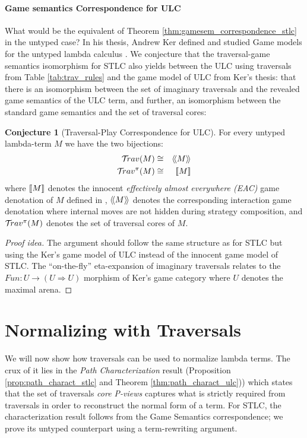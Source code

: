 \documentclass{article}
\theoremstyle{definition}
\newtheorem{conjecture}{Conjecture}[section]
\newcommand{\travulc}{\travset}
\def\coresymbol{\pi} %
\begin{document}
\paragraph{Game semantics Correspondence for ULC}
What would be the equivalent of Theorem \ref{thm:gamesem_correspondence_stlc} in the untyped case? In his thesis, Andrew Ker defined and studied Game models for the untyped lambda calculus \cite{KerThesis}.  We conjecture that the traversal-game semantics isomorphism for STLC also yields between the ULC using traversals from Table \ref{tab:trav_rules} and the game model of ULC from Ker's thesis: that there is an isomorphism between the set of imaginary traversals and the revealed game semantics of the ULC term, and further, an isomorphism between the standard game semantics and the set of traversal cores:

\begin{conjecture}[Traversal-Play Correspondence for ULC]
\label{conj:ulc_corresp}
For every untyped lambda-term $M$ we have the two bijections:
\begin{eqnarray*}
 \travulc(M) &\cong& \revsem{M} \\
 \travulc^\coresymbol(M) &\cong& \sem{M}
\end{eqnarray*}
where ${[\![ M ]\!]}$ denotes the innocent \emph{effectively almost everywhere (EAC)} game denotation of $M$ defined in \cite{KerThesis},
${\langle\!\langle M \rangle\!\rangle}$ denotes the corresponding interaction game denotation where internal moves are not hidden during strategy composition,
and $\travulc^\coresymbol(M)$ denotes the set of traversal cores of $M$.
\end{conjecture}

\begin{proof}[Proof idea]
The argument should follow the same structure as for STLC \cite{BlumPhd} but using the Ker's game model of ULC instead of the innocent game model of STLC. The ``on-the-fly'' eta-expansion of imaginary traversals relates to the $Fun : U \rightarrow (U \Rightarrow U)$ morphism of Ker's game category where $U$ denotes the maximal arena.
\end{proof}

\section{Normalizing with Traversals}

We will now show how traversals can be used to normalize lambda terms. The crux of it lies in the \emph{Path Characterization} result (Proposition \ref{prop:path_charact_stlc} and Theorem \ref{thm:path_charact_ulc})) which states that the set of traversals \emph{core P-views} captures what is strictly required from traversals in order to reconstruct the normal form of a term.
For STLC, the characterization result follows from the Game Semantics correspondence; we prove its untyped counterpart using a term-rewriting argument.
\end{document}
